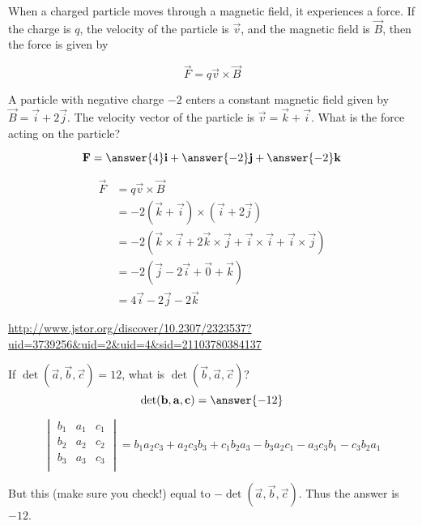 \documentclass{ximera}
\begin{document}
When a charged particle moves through a magnetic field, it experiences a force.  If the charge is $q$, the velocity of the particle is $\vec{v}$, and the magnetic field is $\vec{B}$, then the force is given by

\[
\vec{F} = q\vec{v} \times \vec{B}
\]

\begin{question}
	A particle with negative charge $-2$ enters a constant magnetic field given by $\vec{B} = \vec{i}+2\vec{j}$.  The velocity vector of the particle is  $\vec{v} = \vec{k}+\vec{i}$.  What is the force acting on the particle?
	
	\[
	\vec{F} = \answer{4}\vec{i}+\answer{-2}\vec{j}+\answer{-2}\vec{k}
	\]
	
	\begin{hint}
		\begin{align*}
			\vec{F} &= q\vec{v} \times \vec{B}\\
				&= -2 ( \vec{k}+\vec{i}) \times (\vec{i}+2\vec{j})\\
				&=-2( \vec{k} \times \vec{i}+2\vec{k} \times \vec{j}+\vec{i} \times \vec{i}+\vec{i} \times \vec{j})\\
				&=-2(\vec{j}-2\vec{i}+\vec{0}+\vec{k})\\
				&=4\vec{i}-2\vec{j}-2\vec{k}
		\end{align*}
	\end{hint}
\end{question}





\url{http://www.jstor.org/discover/10.2307/2323537?uid=3739256&uid=2&uid=4&sid=21103780384137}

















\begin{question}
  If $\det(\vec{a},\vec{b},\vec{c}) = 12$, what is
  $\det(\vec{b},\vec{a},\vec{c})$?
  \[
  \det(\vec{b},\vec{a},\vec{c}) = \answer{-12}
  \]
  \begin{hint}
    \[
    \begin{vmatrix} 
      b_1 & a_1 & c_1\\
      b_2 & a_2 & c_2\\
      b_3 & a_3 & c_3\\
    \end{vmatrix}
    =b_1a_2c_3+a_2c_3b_3+c_1b_2a_3-b_3a_2c_1-a_3c_3b_1-c_3b_2a_1
    \]
    
    But this (make sure you check!) equal to
    $-\det(\vec{a},\vec{b},\vec{c})$.  Thus the answer is $-12$.
  \end{hint}
\end{question}
\end{document}
